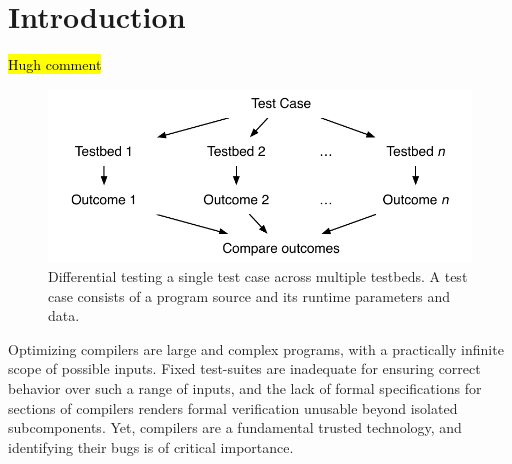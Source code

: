 \section{Introduction}\label{sec:intro}

\hl{Hugh comment}

\begin{figure}
  \centering
  \includegraphics[width=.85\columnwidth]{img/difftest} %
  \caption{%
    Differential testing a single test case across multiple testbeds. A test case consists of a program source and its runtime parameters and data. %
  }%
  \label{fig:difftest}
\end{figure}

\noindent
Optimizing compilers are large and complex programs, with a practically infinite scope of possible inputs. Fixed test-suites are inadequate for ensuring correct behavior over such a range of inputs, and the lack of formal specifications for sections of compilers renders formal verification unusable beyond isolated subcomponents.  Yet, compilers are a fundamental trusted technology, and identifying their bugs is of critical importance.


